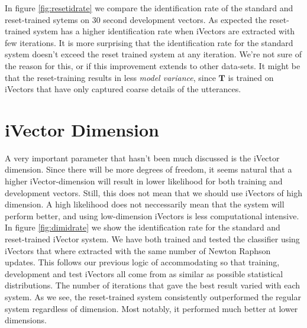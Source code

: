 In figure \ref{fig:resetidrate} we compare the identification rate of the standard and reset-trained sytems on 30 second development vectors. As expected the reset-trained system has a higher identification rate when iVectors are extracted with few iterations. It is more surprising that the identification rate for the standard system doesn't exceed the reset trained system at any iteration. We're not sure of the reason for this, or if this improvement extends to other data-sets. It might be that the reset-training results in less \emph{model variance}, since $\mathbf{T}$ is trained on iVectors that have only captured coarse details of the utterances. 

\section{iVector Dimension}
\label{sect:ivectdimtests}

A very important parameter that hasn't been much discussed is the iVector dimension. Since there will be more degrees of freedom, it seems natural that a higher iVector-dimension will result in lower likelihood for both training and development vectors. Still, this does not mean that we should use iVectors of high dimension. A high likelihood does not neccessarily mean that the system will perform better, and using low-dimension iVectors is less computational intensive.  In figure \ref{fig:dimidrate} we show the identification rate for the standard and reset-trained iVector system. We have both trained and tested the classifier using iVectors that where extracted with the same number of Newton Raphson updates. This follows our previous logic of accommodating so that training, development and test iVectors all come from as similar as possible statistical distributions. The number of iterations that gave the best result varied with each system. As we see, the reset-trained system consistently outperformed the regular system regardless of dimension. Most notably, it performed much better at lower dimensions.

